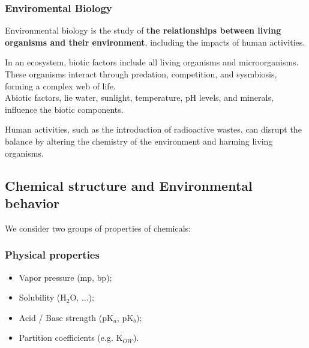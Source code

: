 \documentclass{article}
\begin{document}
\subsubsection{Enviromental Biology}
Environmental biology is the study of \textbf{the relationships between
living organisms and their environment}, including the impacts of
human activities.

\begin{center}
    \vspace*{0.25cm}
\end{center}

In an ecosystem, biotic factors include all living organisms and
microorganisms. These organisms interact through predation, competition,
and sysmbiosis, forming a complex web of life.\\
Abiotic factors, lie water, sunlight, temperature, pH levels, and
minerals, influence the biotic components.

Human activities, such as the introduction of radioactive wastes, can
disrupt the balance by altering the chemistry of the environment and
harming living organisms.

\subsection{Chemical structure and Environmental behavior}
We consider two groups of properties of chemicals:
\subsubsection{Physical properties}
\begin{itemize}
    \item Vapor pressure (mp, bp);
    \item Solubility (H$_2$O, ...);
    \item Acid / Base strength (pK$_a$, pK$_b$);
    \item Partition coefficients (e.g. K$_{OW}$).
\end{itemize}
\end{document}
